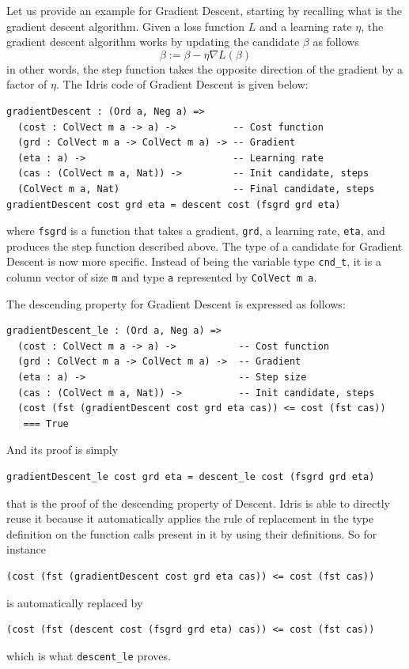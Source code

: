 \documentclass[]{report}
\begin{document}
Let us provide an example for Gradient Descent, starting by recalling
what is the gradient descent algorithm.  Given a loss function $L$ and
a learning rate $\eta$, the gradient descent algorithm works by
updating the candidate $\beta$ as follows
$$\beta := \beta - \eta \nabla L(\beta)$$
in other words, the step function takes the opposite direction of the
gradient by a factor of $\eta$.  The Idris code of Gradient Descent is
given below:
\begin{verbatim}
gradientDescent : (Ord a, Neg a) =>
  (cost : ColVect m a -> a) ->          -- Cost function
  (grd : ColVect m a -> ColVect m a) -> -- Gradient
  (eta : a) ->                          -- Learning rate
  (cas : (ColVect m a, Nat)) ->         -- Init candidate, steps
  (ColVect m a, Nat)                    -- Final candidate, steps
gradientDescent cost grd eta = descent cost (fsgrd grd eta)
\end{verbatim}
where \texttt{fsgrd} is a function that takes a gradient,
\texttt{grd}, a learning rate, \texttt{eta}, and produces the step
function described above.  The type of a candidate for Gradient
Descent is now more specific.  Instead of being the variable type
\texttt{cnd\_t}, it is a column vector of size \texttt{m} and type
\texttt{a} represented by \texttt{ColVect m a}.

The descending property for Gradient Descent is expressed as follows:
\begin{verbatim}
gradientDescent_le : (Ord a, Neg a) =>
  (cost : ColVect m a -> a) ->           -- Cost function
  (grd : ColVect m a -> ColVect m a) ->  -- Gradient
  (eta : a) ->                           -- Step size
  (cas : (ColVect m a, Nat)) ->          -- Init candidate, steps
  (cost (fst (gradientDescent cost grd eta cas)) <= cost (fst cas))
   === True
\end{verbatim}
And its proof is simply
\begin{verbatim}
gradientDescent_le cost grd eta = descent_le cost (fsgrd grd eta)
\end{verbatim}
that is the proof of the descending property of Descent. Idris is able
to directly reuse it because it automatically applies the rule of
replacement in the type definition on the function calls present in it
by using their definitions.  So for instance
\begin{verbatim}
(cost (fst (gradientDescent cost grd eta cas)) <= cost (fst cas))
\end{verbatim}
is automatically replaced by
\begin{verbatim}
(cost (fst (descent cost (fsgrd grd eta) cas)) <= cost (fst cas))
\end{verbatim}
which is what \texttt{descent\_le} proves.
\end{document}
